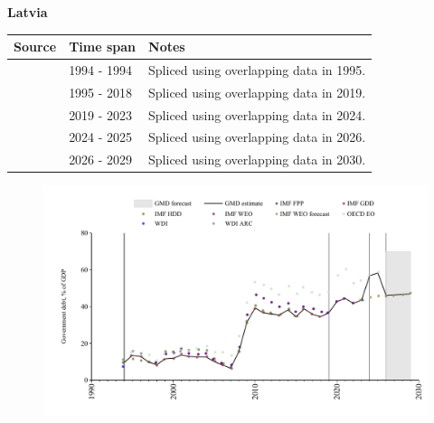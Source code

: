 \documentclass[12pt,a4paper,landscape]{article}
\begin{document}
\begin{adjustbox}{max totalsize={\paperwidth}{\paperheight},center}
\begin{minipage}[t][\textheight][t]{\textwidth}
\vspace*{0.5cm}
{}
\begin{center}
{\Large\bfseries Latvia}
\end{center}
\vspace{0.5cm}
\begin{table}[H]
\centering
\small
\begin{tabular}{|l|l|l|}
\hline
\textbf{Source} & \textbf{Time span} & \textbf{Notes} \\
\hline
\rowcolor{white}\cite{IMF_HDD}& 1994 - 1994 &Spliced using overlapping data in 1995.\\
\rowcolor{lightgray}\cite{IMF_GDD}& 1995 - 2018 &Spliced using overlapping data in 2019.\\
\rowcolor{white}\cite{IMF_FPP}& 2019 - 2023 &Spliced using overlapping data in 2024.\\
\rowcolor{lightgray}\cite{OECD_EO}& 2024 - 2025 &Spliced using overlapping data in 2026.\\
\rowcolor{white}\cite{IMF_WEO_forecast}& 2026 - 2029 &Spliced using overlapping data in 2030.\\
\hline
\end{tabular}
\end{table}
\begin{figure}[H]
\centering
\includegraphics[width=\textwidth,height=0.6\textheight,keepaspectratio]{graphs/LVA_govdebt_GDP.pdf}
\end{figure}
\end{minipage}
\end{adjustbox}
\end{document}
